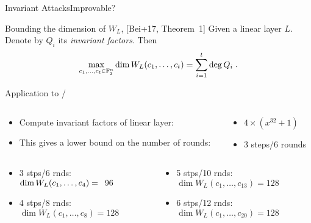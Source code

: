 \begin{frame}{Invariant Attacks}{Improvable?}
    \begin{block}{Bounding the dimension of $W_L$, [Bei+17, Theorem~1]}
        Given a linear layer $L$.
        Denote by $Q_i$ its \emph{invariant factors}.
        Then
        \begin{equation*}
            \max_{c_1, \dots, c_t \in \mathbb{F}_2^n} \dim W_L(c_1, \dots, c_t) = \sum_{i=1}^t \deg Q_i\;.
        \end{equation*}
    \end{block}
    \pause
    \begin{block}{Application to \clyde/}
    \begin{columns}
        \begin{column}{0.6\textwidth}
        \begin{itemize}
            \item Compute invariant factors of linear layer:
            \item This gives a lower bound on the number of rounds:
        \end{itemize}
        \end{column}
        \pause
        \begin{column}{0.35\textwidth}
        \begin{itemize}
            \item[] $4 \times (x^{32}+1)$
            \item[] 3 steps/6 rounds
        \end{itemize}
        \end{column}
    \end{columns}
    \pause
    \begin{columns}
        \begin{column}{0.475\textwidth}
            \begin{itemize}
                \item 3 stps/6 rnds: $\dim W_L(c_1,\dots,c_4) = \hphantom{1}96$
                \item 4 stps/8 rnds: $\dim W_L(c_1,\dots,c_8) = 128$
            \end{itemize}
        \end{column}
        \begin{column}{0.475\textwidth}
            \begin{itemize}
                \item 5 stps/10 rnds: $\dim W_L(c_1,\dots,c_{13}) = 128$
                \item 6 stps/12 rnds: $\dim W_L(c_1,\dots,c_{20}) = 128$
            \end{itemize}
        \end{column}
    \end{columns}
    \end{block}
\end{frame}
